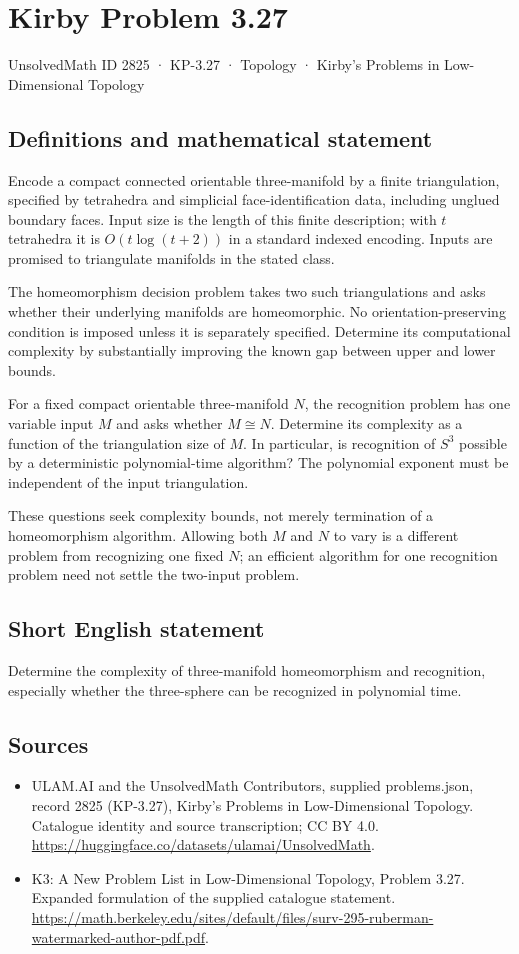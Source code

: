 \documentclass[11pt,a4paper]{article}
\begin{document}
\section*{Kirby Problem 3.27}\label{2825}
{\small UnsolvedMath ID 2825 · KP-3.27 · Topology · Kirby's Problems in Low-Dimensional Topology}
\subsection{Definitions and mathematical statement}
Encode a compact connected orientable three-manifold by a finite triangulation,
specified by tetrahedra and simplicial face-identification data, including
unglued boundary faces. Input size is the length of this finite description;
with $t$ tetrahedra it is $O(t\log(t+2))$ in a standard indexed encoding.
Inputs are promised to triangulate manifolds in the stated class.

The homeomorphism decision problem takes two such triangulations and asks
whether their underlying manifolds are homeomorphic. No orientation-preserving
condition is imposed unless it is separately specified. Determine its
computational complexity by substantially improving the known gap between
upper and lower bounds.

For a fixed compact orientable three-manifold $N$, the recognition problem
has one variable input $M$ and asks whether $M\cong N$. Determine its
complexity as a function of the triangulation size of $M$. In particular,
is recognition of $S^3$ possible by a deterministic polynomial-time algorithm?
The polynomial exponent must be independent of the input triangulation.

These questions seek complexity bounds, not merely termination of a
homeomorphism algorithm. Allowing both $M$ and $N$ to vary is a different
problem from recognizing one fixed $N$; an efficient algorithm for one
recognition problem need not settle the two-input problem.
\subsection{Short English statement}
Determine the complexity of three-manifold homeomorphism and recognition, especially whether the three-sphere can be recognized in polynomial time.
\subsection{Sources}
\begin{itemize}
\item[S1] ULAM.AI and the UnsolvedMath Contributors, supplied problems.json, record 2825 (KP-3.27), Kirby's Problems in Low-Dimensional Topology. Catalogue identity and source transcription; CC BY 4.0.
\url{https://huggingface.co/datasets/ulamai/UnsolvedMath}.
\item[S2] K3: A New Problem List in Low-Dimensional Topology, Problem 3.27. Expanded formulation of the supplied catalogue statement.
\url{https://math.berkeley.edu/sites/default/files/surv-295-ruberman-watermarked-author-pdf.pdf}.
\end{itemize}
\end{document}
